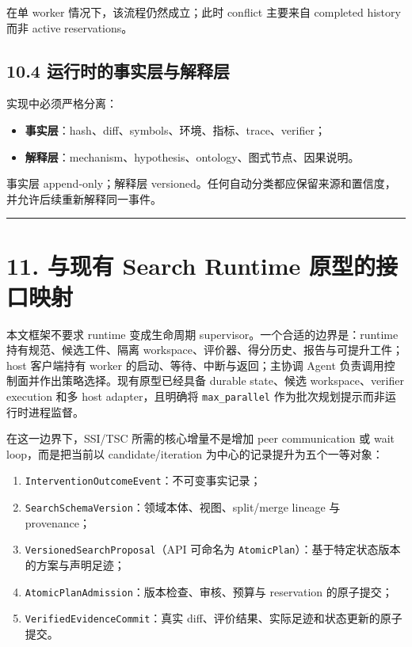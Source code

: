 \documentclass[
  11pt]{ctexart}
\providecommand{\tightlist}{%
  \setlength{\itemsep}{0pt}\setlength{\parskip}{0pt}}
\begin{document}
在单 worker 情况下，该流程仍然成立；此时 conflict 主要来自 completed
history 而非 active reservations。

\subsection{10.4
运行时的事实层与解释层}\label{ux8fd0ux884cux65f6ux7684ux4e8bux5b9eux5c42ux4e0eux89e3ux91caux5c42}

实现中必须严格分离：

\begin{itemize}
\tightlist
\item
  \textbf{事实层}：hash、diff、symbols、环境、指标、trace、verifier；
\item
  \textbf{解释层}：mechanism、hypothesis、ontology、图式节点、因果说明。
\end{itemize}

事实层 append-only；解释层
versioned。任何自动分类都应保留来源和置信度，并允许后续重新解释同一事件。

\begin{center}\rule{0.5\linewidth}{0.5pt}\end{center}

\section{11. 与现有 Search Runtime
原型的接口映射}\label{ux4e0eux73b0ux6709-search-runtime-ux539fux578bux7684ux63a5ux53e3ux6620ux5c04}

本文框架不要求 runtime 变成生命周期
supervisor。一个合适的边界是：runtime 持有规范、候选工件、隔离
workspace、评价器、得分历史、报告与可提升工件；host 客户端持有 worker
的启动、等待、中断与返回；主协调 Agent
负责调用控制面并作出策略选择。现有原型已经具备 durable state、候选
workspace、verifier execution 和多 host adapter，且明确将
\texttt{max\_parallel} 作为批次规划提示而非运行时进程监督。

在这一边界下，SSI/TSC 所需的核心增量不是增加 peer communication 或 wait
loop，而是把当前以 candidate/iteration 为中心的记录提升为五个一等对象：

\begin{enumerate}
\def\labelenumi{\arabic{enumi}.}
\tightlist
\item
  \texttt{InterventionOutcomeEvent}：不可变事实记录；
\item
  \texttt{SearchSchemaVersion}：领域本体、视图、split/merge lineage 与
  provenance；
\item
  \texttt{VersionedSearchProposal}（API 可命名为
  \texttt{AtomicPlan}）：基于特定状态版本的方案与声明足迹；
\item
  \texttt{AtomicPlanAdmission}：版本检查、审核、预算与 reservation
  的原子提交；
\item
  \texttt{VerifiedEvidenceCommit}：真实
  diff、评价结果、实际足迹和状态更新的原子提交。
\end{enumerate}
\end{document}
